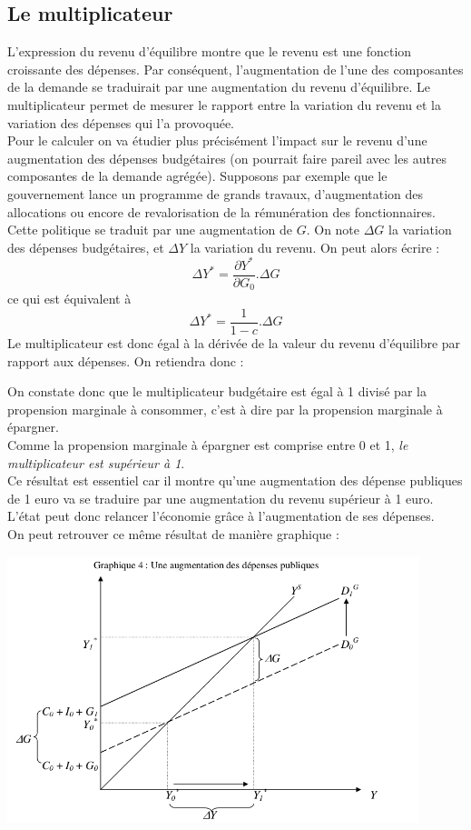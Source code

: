 \documentclass[10pt]{book}
\begin{document}
\subsection{Le multiplicateur}
L'expression du revenu d'équilibre montre que le revenu est une fonction croissante des dépenses. Par conséquent, l'augmentation de l'une des composantes de la demande se traduirait par une augmentation du revenu d'équilibre. Le multiplicateur permet de mesurer le rapport entre la variation du revenu et la variation des dépenses qui l'a provoquée. \\
Pour le calculer on va étudier plus précisément l'impact sur le revenu d'une augmentation des dépenses budgétaires (on pourrait faire pareil avec les autres composantes de la demande agrégée). Supposons par exemple que le gouvernement lance un programme de grands travaux, d'augmentation des allocations ou encore de revalorisation de la rémunération des fonctionnaires. Cette politique se traduit par une augmentation de $G$. On note $\Delta G$ la variation des dépenses budgétaires, et $\Delta Y$ la variation du revenu. On peut alors écrire :
$$ \Delta Y^* = \frac{\partial{Y^*}}{\partial{G_0}}.\Delta G$$
ce qui est équivalent à
$$ \Delta Y^* = \frac{1}{1-c}.\Delta G$$
Le multiplicateur est donc égal à la dérivée de la valeur du revenu d'équilibre par rapport aux dépenses. On retiendra donc : 
\begin{center}
\end{center}
On constate donc que le multiplicateur budgétaire est égal à 1 divisé par la propension marginale à consommer, c'est à dire par la propension marginale à épargner. \\
Comme la propension marginale à épargner est comprise entre 0 et 1, \textit{le multiplicateur est supérieur à 1}. \\
Ce résultat est essentiel car il montre qu'une augmentation des dépense publiques de 1 euro va se traduire par une augmentation du revenu supérieur à 1 euro.  L'état peut donc relancer l'économie grâce à l'augmentation de ses dépenses. \\
On peut retrouver ce même résultat de manière graphique :
\begin{center}
  \includegraphics[width=12cm]{graph15.png}
\end{center}
\end{document}
